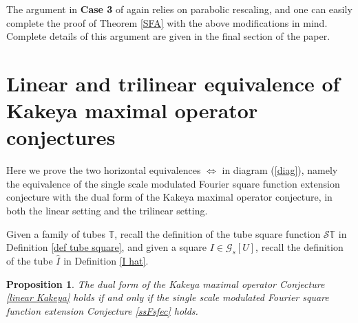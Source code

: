 \documentclass{amsart}%
\theoremstyle{plain}
\newtheorem{proposition}[theorem]{Proposition}
\numberwithin{equation}{section}
\begin{document}
The argument in \textbf{Case 3} of \cite[proof of Theorem 3]{RiSa} again
relies on parabolic rescaling, and one can easily complete the proof of
Theorem \ref{SFA} with the above modifications in mind. Complete details of
this argument are given in the final section of the paper.

\section{Linear and trilinear equivalence of Kakeya maximal operator
conjectures}

Here we prove the two horizontal equivalences $\Longleftrightarrow$ in diagram
(\ref{diag}), namely the equivalence of the single scale modulated Fourier
square function extension conjecture with the dual form of the Kakeya maximal
operator conjecture, in both the linear setting and the trilinear setting.

Given a family of tubes $\mathbb{T}$, recall the definition of the tube square
function $\mathcal{S}\mathbb{T}$ in Definition \ref{def tube square}, and
given a square $I\in\mathcal{G}_{s}\left[  U\right]  $, recall the definition
of the tube $\widehat{I}$ in Definition \ref{I hat}.

\begin{proposition}
\label{Kak equiv}The dual form of the Kakeya maximal operator Conjecture
\ref{linear Kakeya} holds \emph{if and only if} the single scale modulated
Fourier square function extension Conjecture \ref{ssFsfec} holds.
\end{proposition}
\end{document}
